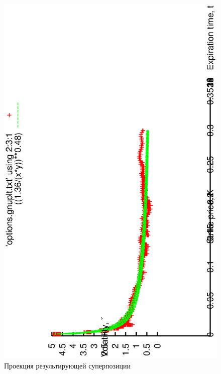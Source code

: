 \documentclass[12pt,a4paper]{amsart}
\begin{document}
\begin{figure}[h]
  \includegraphics[scale=0.80,angle=-90]{figs/1-proj.eps}
  \caption{Проекция результирующей суперпозиции}
  \label{fig:1_proj}
\end{figure}
\end{document}
